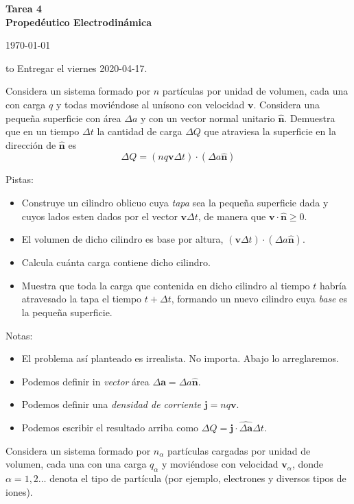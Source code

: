 \documentclass{exam}
\begin{document}
\begin{center}
\bf\large Tarea 4\\
Propedéutico Electrodinámica\\
\date{2020-04-12}
\today\\[20pt]
\end{center}
\hbox to \textwidth{Nombre: \enspace\hrulefill}
Entregar el viernes 2020-04-17.

\begin{questions}
\question Considera un sistema formado por $n$ partículas por unidad
  de volumen, cada una con carga $q$ y todas moviéndose al unísono con
  velocidad $\bm v$. Considera una pequeña superficie con área $\Delta
  a$ y con un vector normal unitario $\hat {\bm n}$. Demuestra que en
  un tiempo $\Delta t$ la cantidad de carga $\Delta Q$ que atraviesa
  la superficie en la dirección de $\hat{\bm n}$  es
  $$
  \Delta Q=(n q \bm v\Delta t)\cdot(\Delta a \hat{\bm n})
  $$

  Pistas:
  \begin{itemize}
  \item Construye un cilindro oblicuo cuya {\em tapa} sea la pequeña
    superficie dada y cuyos lados esten dados por el vector $\bm v\Delta
    t$, de manera que $\bm v\cdot\hat{\bm n} \ge 0$.
  \item El volumen de dicho cilindro es base por altura, $(\bm v\Delta
    t)\cdot(\Delta a\hat{\bm n})$.
  \item Calcula cuánta carga contiene dicho cilindro.
  \item  Muestra que toda la carga que contenida en dicho cilindro al
    tiempo $t$ habría atravesado la tapa el tiempo $t+\Delta t$,
    formando un nuevo cilindro cuya {\em base} es la pequeña
    superficie.
  \end{itemize}

  Notas:
  \begin{itemize}
  \item El problema así planteado es irrealista. No importa. Abajo lo arreglaremos.
  \item Podemos definir in {\em vector} área $\Delta \bm a=\Delta
    a\hat{\bm n}$.
  \item Podemos definir una {\em densidad de corriente} $\bm j=n q\bm
    v$.
  \item Podemos escribir el resultado arriba como $\Delta Q=\bm
    j\cdot\hat{\Delta \bm a}\Delta t$.
  \end{itemize}

  \question Considera un sistema formado por $n_\alpha$ partículas cargadas por
    unidad de volumen, cada una con una carga $q_\alpha$ y moviéndose
    con velocidad $\bm v_\alpha$, donde
    $\alpha=1,2\ldots$ denota el tipo de partícula (por ejemplo,
    electrones y diversos tipos de iones).
    \begin{parts}

\end{parts}
\end{questions}
\end{document}
